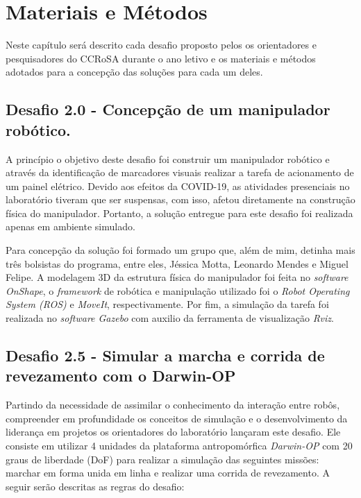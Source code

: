 \chapter{Materiais e Métodos}
\label{chap:mat}

Neste capítulo será descrito cada desafio proposto pelos os orientadores e pesquisadores do CCRoSA durante o ano letivo e os materiais e métodos adotados para a concepção das soluções para cada um deles.


\section{Desafio 2.0 - Concepção de um manipulador robótico.}
\label{sec:desafio2.0}

A princípio o objetivo deste desafio foi construir um manipulador robótico e através da identificação de marcadores visuais realizar a tarefa de acionamento de um painel elétrico. Devido aos efeitos da COVID-19, as atividades presenciais no laboratório tiveram que ser suspensas, com isso, afetou diretamente na construção física do manipulador. Portanto, a solução entregue para este desafio foi realizada apenas em ambiente simulado. 

Para concepção da solução foi formado um grupo que, além de mim, detinha mais três bolsistas do programa, entre eles, Jéssica Motta, Leonardo Mendes e Miguel Felipe. A modelagem 3D da estrutura física do manipulador foi feita no \textit{software OnShape}, o \textit{framework} de robótica e manipulação utilizado foi o \textit{Robot Operating System (ROS)} e \textit{MoveIt}, respectivamente. Por fim, a simulação da tarefa foi realizada no \textit{software Gazebo} com auxilio da ferramenta de visualização \textit{Rviz}. 

\section{Desafio 2.5 - Simular a marcha e corrida de revezamento com o Darwin-OP}
\label{sec:desafio2.5}

Partindo da necessidade de assimilar o conhecimento da interação entre robôs, compreender em profundidade os conceitos de simulação e o desenvolvimento da liderança em projetos os orientadores do laboratório lançaram este desafio. Ele consiste em utilizar 4 unidades da plataforma antropomórfica \textit{Darwin-OP} com 20 graus de liberdade (DoF) para realizar a simulação das seguintes missões: marchar em forma unida em linha e realizar uma corrida de revezamento. A seguir serão descritas as regras do desafio:

